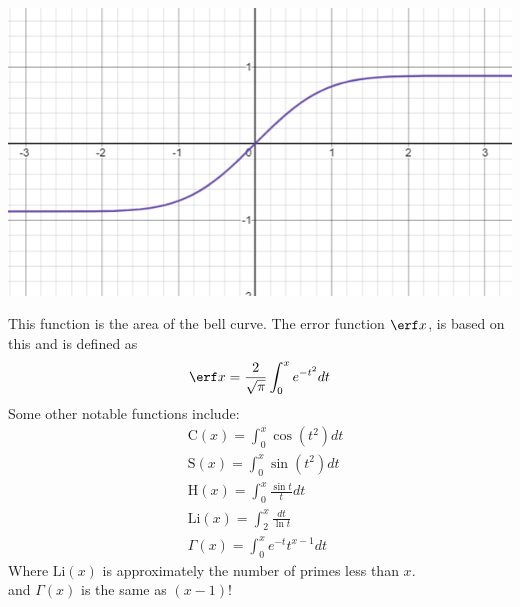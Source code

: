 \centerline{\includegraphics[scale=0.8]{IntegralCalcPictures/AreaOfBellCurve.png}}
This function is the area of the bell curve. The error function $\erf x$, is based on this and is defined as
$$\erf x=\frac{2}{\sqrt{\pi}}\int_0^xe^{-t^2}dt$$
Some other notable functions include:
\begin{align*}
    &\mathrm{C}(x)=\int_0^x\cos(t^2)dt\\
    &\mathrm{S}(x)=\int_0^x\sin(t^2)dt\\
    &\mathrm{H}(x)=\int_0^x\frac{\sin t}{t}dt\\
    &\mathrm{Li}(x)=\int_2^x\frac{dt}{\ln t}\\
    &\Gamma(x)=\int_0^xe^{-t}t^{x-1}dt
\end{align*}
Where $\mathrm{Li}(x)$ is approximately the number of primes less than $x$.\\
and $\Gamma(x)$ is the same as $(x-1)!$